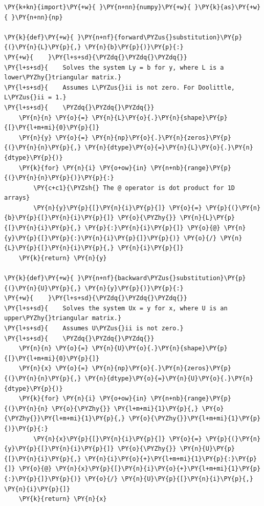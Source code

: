 \begin{Verbatim}[commandchars=\\\{\}]
\PY{k+kn}{import}\PY{+w}{ }\PY{n+nn}{numpy}\PY{+w}{ }\PY{k}{as}\PY{+w}{ }\PY{n+nn}{np}

\PY{k}{def}\PY{+w}{ }\PY{n+nf}{forward\PYZus{}substitution}\PY{p}{(}\PY{n}{L}\PY{p}{,} \PY{n}{b}\PY{p}{)}\PY{p}{:}
\PY{+w}{    }\PY{l+s+sd}{\PYZdq{}\PYZdq{}\PYZdq{}}
\PY{l+s+sd}{    Solves the system Ly = b for y, where L is a lower\PYZhy{}triangular matrix.}
\PY{l+s+sd}{    Assumes L\PYZus{}ii is not zero. For Doolittle, L\PYZus{}ii = 1.}
\PY{l+s+sd}{    \PYZdq{}\PYZdq{}\PYZdq{}}
    \PY{n}{n} \PY{o}{=} \PY{n}{L}\PY{o}{.}\PY{n}{shape}\PY{p}{[}\PY{l+m+mi}{0}\PY{p}{]}
    \PY{n}{y} \PY{o}{=} \PY{n}{np}\PY{o}{.}\PY{n}{zeros}\PY{p}{(}\PY{n}{n}\PY{p}{,} \PY{n}{dtype}\PY{o}{=}\PY{n}{L}\PY{o}{.}\PY{n}{dtype}\PY{p}{)}
    \PY{k}{for} \PY{n}{i} \PY{o+ow}{in} \PY{n+nb}{range}\PY{p}{(}\PY{n}{n}\PY{p}{)}\PY{p}{:}
        \PY{c+c1}{\PYZsh{} The @ operator is dot product for 1D arrays}
        \PY{n}{y}\PY{p}{[}\PY{n}{i}\PY{p}{]} \PY{o}{=} \PY{p}{(}\PY{n}{b}\PY{p}{[}\PY{n}{i}\PY{p}{]} \PY{o}{\PYZhy{}} \PY{n}{L}\PY{p}{[}\PY{n}{i}\PY{p}{,} \PY{p}{:}\PY{n}{i}\PY{p}{]} \PY{o}{@} \PY{n}{y}\PY{p}{[}\PY{p}{:}\PY{n}{i}\PY{p}{]}\PY{p}{)} \PY{o}{/} \PY{n}{L}\PY{p}{[}\PY{n}{i}\PY{p}{,} \PY{n}{i}\PY{p}{]}
    \PY{k}{return} \PY{n}{y}

\PY{k}{def}\PY{+w}{ }\PY{n+nf}{backward\PYZus{}substitution}\PY{p}{(}\PY{n}{U}\PY{p}{,} \PY{n}{y}\PY{p}{)}\PY{p}{:}
\PY{+w}{    }\PY{l+s+sd}{\PYZdq{}\PYZdq{}\PYZdq{}}
\PY{l+s+sd}{    Solves the system Ux = y for x, where U is an upper\PYZhy{}triangular matrix.}
\PY{l+s+sd}{    Assumes U\PYZus{}ii is not zero.}
\PY{l+s+sd}{    \PYZdq{}\PYZdq{}\PYZdq{}}
    \PY{n}{n} \PY{o}{=} \PY{n}{U}\PY{o}{.}\PY{n}{shape}\PY{p}{[}\PY{l+m+mi}{0}\PY{p}{]}
    \PY{n}{x} \PY{o}{=} \PY{n}{np}\PY{o}{.}\PY{n}{zeros}\PY{p}{(}\PY{n}{n}\PY{p}{,} \PY{n}{dtype}\PY{o}{=}\PY{n}{U}\PY{o}{.}\PY{n}{dtype}\PY{p}{)}
    \PY{k}{for} \PY{n}{i} \PY{o+ow}{in} \PY{n+nb}{range}\PY{p}{(}\PY{n}{n} \PY{o}{\PYZhy{}} \PY{l+m+mi}{1}\PY{p}{,} \PY{o}{\PYZhy{}}\PY{l+m+mi}{1}\PY{p}{,} \PY{o}{\PYZhy{}}\PY{l+m+mi}{1}\PY{p}{)}\PY{p}{:}
        \PY{n}{x}\PY{p}{[}\PY{n}{i}\PY{p}{]} \PY{o}{=} \PY{p}{(}\PY{n}{y}\PY{p}{[}\PY{n}{i}\PY{p}{]} \PY{o}{\PYZhy{}} \PY{n}{U}\PY{p}{[}\PY{n}{i}\PY{p}{,} \PY{n}{i}\PY{o}{+}\PY{l+m+mi}{1}\PY{p}{:}\PY{p}{]} \PY{o}{@} \PY{n}{x}\PY{p}{[}\PY{n}{i}\PY{o}{+}\PY{l+m+mi}{1}\PY{p}{:}\PY{p}{]}\PY{p}{)} \PY{o}{/} \PY{n}{U}\PY{p}{[}\PY{n}{i}\PY{p}{,} \PY{n}{i}\PY{p}{]}
    \PY{k}{return} \PY{n}{x}
\end{Verbatim}

